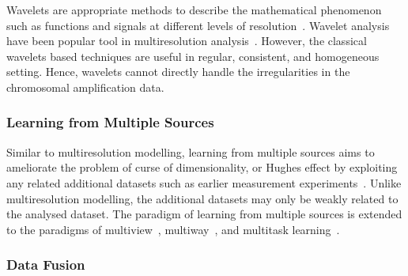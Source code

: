 Wavelets are appropriate methods to describe the mathematical 
phe\-nom\-e\-non such as functions and signals at different levels 
of resolution~\cite{mallat89}. Wavelet analysis have been 
popular tool in multiresolution analysis~\cite{jawerth94}.
However, the classical wavelets based techniques are useful 
in regular, consistent, and  homogeneous setting. Hence, 
wavelets cannot directly handle the irregularities in the 
chromosomal amplification data.


\subsubsection{Learning from Multiple Sources}
\label{ss:lfms}

Similar to multi\-resolution modelling, 
learning from multiple sources aims to ameliorate the 
problem of curse of dimensionality, or Hughes effect by 
exploiting any related additional datasets 
such as earlier measurement experiments~\cite{crammer08}. 
Unlike multi\-resolution modelling, the additional datasets 
may only be weakly related to the analysed dataset. The 
para\-digm of learning from multiple sources is extended 
to the paradigms of multiview~\cite{sun13multiview}, 
multiway~\cite{huopaniemi10ismb}, and 
multitask learning~\cite{caruna97}.

\subsubsection{Data Fusion}
\label{ss:dataFusion}

